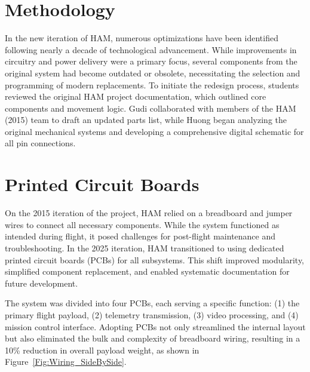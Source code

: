 
\vspace{-2em}  %
\section{Methodology}
\vspace{-2em}  %

In the new iteration of HAM, numerous optimizations have been identified following nearly a decade of technological advancement. While improvements in circuitry and power delivery were a primary focus, several components from the original system had become outdated or obsolete, necessitating the selection and programming of modern replacements. To initiate the redesign process, students reviewed the original HAM project documentation, which outlined core components and movement logic. Gudi collaborated with members of the HAM (2015) team to draft an updated parts list, while Huong began analyzing the original mechanical systems and developing a comprehensive digital schematic for all pin connections. \par

\vspace{-2em}  %
\section{Printed Circuit Boards}
\vspace{-2em}  %

On the 2015 iteration of the project, HAM relied on a breadboard and jumper wires to connect all necessary components. While the system functioned as intended during flight, it posed challenges for post-flight maintenance and troubleshooting. In the 2025 iteration, HAM transitioned to using dedicated printed circuit boards (PCBs) for all subsystems. This shift improved modularity, simplified component replacement, and enabled systematic documentation for future development. \par

The system was divided into four PCBs, each serving a specific function: (1) the primary flight payload, (2) telemetry transmission, (3) video processing, and (4) mission control interface. Adopting PCBs not only streamlined the internal layout but also eliminated the bulk and complexity of breadboard wiring, resulting in a 10\% reduction in overall payload weight, as shown in Figure~\ref{Fig:Wiring_SideBySide}. \par

